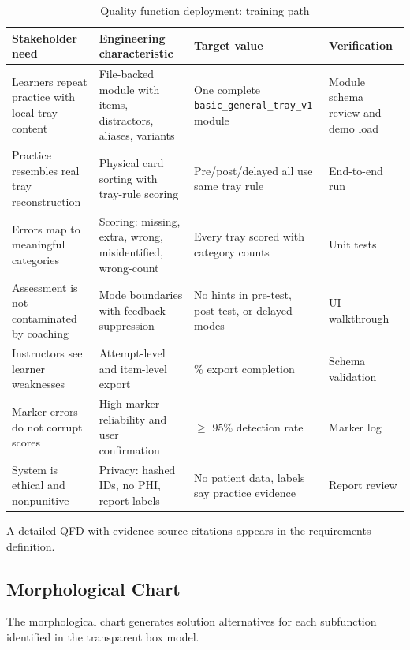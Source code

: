 \documentclass[10pt,a4paper]{article}
\begin{document}
\begin{table}[H]
\centering
\caption{Quality function deployment: training path}
\label{tab:preliminary-quality-function-deployment}
\small\renewcommand{\arraystretch}{1.2}\setlength{\tabcolsep}{4pt}
\begin{tabularx}{\textwidth}{|>{\raggedright\arraybackslash}X|>{\raggedright\arraybackslash}X|>{\raggedright\arraybackslash}X|>{\raggedright\arraybackslash}X|}
\hline
Stakeholder need & Engineering characteristic & Target value & Verification \\
\hline
Learners repeat practice with local tray content & File-backed module with items, distractors, aliases, variants & One complete \texttt{basic\_general\_tray\_v1} module & Module schema review and demo load \\
\hline
Practice resembles real tray reconstruction & Physical card sorting with tray-rule scoring & Pre/post/delayed all use same tray rule & End-to-end run \\
\hline
Errors map to meaningful categories & Scoring: missing, extra, wrong, misidentified, wrong-count & Every tray scored with category counts & Unit tests \\
\hline
Assessment is not contaminated by coaching & Mode boundaries with feedback suppression & No hints in pre-test, post-test, or delayed modes & UI walkthrough \\
\hline
Instructors see learner weaknesses & Attempt-level and item-level export & 100\% export completion & Schema validation \\
\hline
Marker errors do not corrupt scores & High marker reliability and user confirmation & $\ge$ 95\% detection rate & Marker log \\
\hline
System is ethical and nonpunitive & Privacy: hashed IDs, no PHI, report labels & No patient data, labels say practice evidence & Report review \\
\hline
\end{tabularx}
\end{table}

A detailed QFD with evidence-source citations appears in the requirements
definition.

\subsection{Morphological Chart}
\label{sec:morphological-chart}

The morphological chart generates solution alternatives for each subfunction
identified in the transparent box model.
\end{document}
